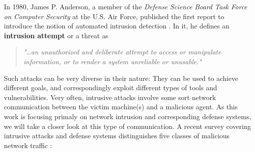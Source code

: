 \documentclass[a4paper,12pt,twoside]{report}
\begin{document}


In 1980, James P. Anderson, a member of the \textit{Defense Science Board Task Force on Computer Security} at the U.S. Air Force, published the first report to introduce the notion of automated intrusion detection \cite{anderson1980computer}. In it, he defines an \textbf{intrusion attempt} or a threat as 

\begin{quote}
\textit{"\dots an unauthorized and deliberate attempt to access or manipulate information, or to render a system unreliable or unusable."}
\end{quote}

Such attacks can be very diverse in their nature: They can be used to achieve different goals, and correspondingly exploit different types of tools and vulnerabilities. Very often, intrusive attacks involve some sort network communication between the victim machine(s) and a malicious agent. As this work is focusing primaly on network intrusion and corresponding defense systems, we will take a closer look at this type of communication. A recent survey covering intrusive attacks and defense systems distinguishes five classes of malicious network traffic \cite{nisioti2018intrusion}:
\end{document}
